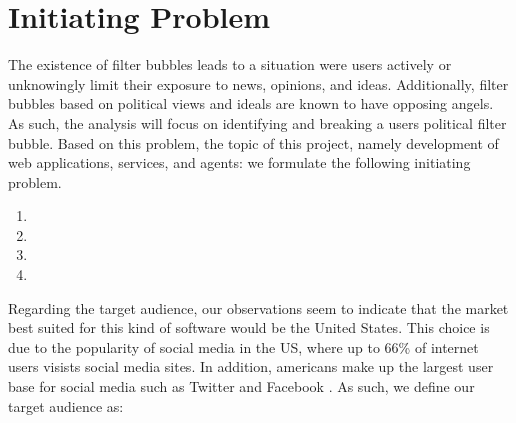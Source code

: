 \section*{Initiating Problem} 
The existence of filter bubbles leads to a situation were users actively or
unknowingly limit their exposure to news, opinions, and ideas. Additionally,
filter bubbles based on political views and ideals are known to have opposing
angels. As such, the analysis will focus on identifying and breaking a users
political filter bubble. Based on this problem, the topic of this project,
namely development of web applications, services, and agents: we formulate the
following initiating problem.


\begin{center}
\begin{minipage}{0.95\linewidth}

\begin{enumerate}
  \item {}
  
  \item {}
  
  \item {}
  
  \item {}
  
\end{enumerate}
\end{minipage}
\end{center}

Regarding the target audience, our observations seem to indicate that the market
best suited for this kind of software would be the United States. This choice is
due to the popularity of social media in the US, where up to 66\% of internet
users visists social media sites\citep{socialMediaActivity}.
In addition, americans make up the largest user base for social media such as
Twitter and Facebook \citep{socialMediaUsersTwitter, socialMediaUsersFacebook}.
As such, we define our target audience as: 
